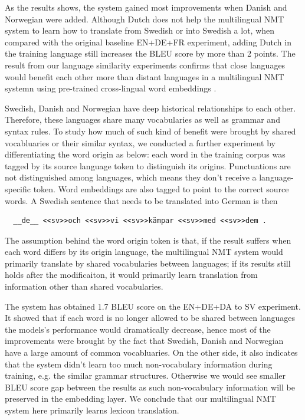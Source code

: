 \documentclass[thesis,fonts=libertine]{cluu}
\begin{document}
As the results shows, the system gained most improvements when Danish and Norwegian were added. Although Dutch does not help the multilingual NMT system to learn how to translate from Swedish or into Swedish a lot, when compared with the original baseline EN+DE+FR experiment, adding Dutch in the training language still increases the BLEU score by more than 2 points. The result from our language similarity experiments confirms that close languages would benefit each other more than distant languages in a multilingual NMT systemn using pre-trained cross-lingual word embeddings \parencite{Qi:2018aa}.

Swedish, Danish and Norwegian have deep historical relationships to each other. Therefore, these languages share many vocabularies as well as grammar and syntax rules. To study how much of such kind of benefit were brought by shared vocabluaries or their similar syntax, we conducted a further experiment by differentiating the word origin as below: each word in the training corpus was tagged by its source language token to distinguish its origins. Punctuations are not distinguished among languages, which means they don't receive a language-specific token. Word embeddings are also tagged to point to the correct source words. A Swedish sentence that needs to be translated into German is then

\begin{verbatim}
  __de__ <<sv>>och <<sv>>vi <<sv>>kämpar <<sv>>med <<sv>>dem .
\end{verbatim}

The assumption behind the word origin token is that, if the result suffers when each word differs by its origin language, the multilingual NMT system would primarily translate by shared vocabularies between languages; if its results still holds after the modificaiton, it would primarily learn translation from information other than shared vocabularies.

The system has obtained 1.7 BLEU score on the EN+DE+DA to SV experiment. It showed that if each word is no longer allowed to be shared between languages the models's performance would dramatically decrease, hence most of the improvements were brought by the fact that Swedish, Danish and Norwegian have a large amount of common vocabluaries. On the other side, it also indicates that the system didn't learn too much non-vocabulary information during training, e.g. the similar grammar structures. Otherwise we would see smaller BLEU score gap between the results as such non-vocabulary information will be preserved in the embedding layer. We conclude that our multilingual NMT system here primarily learns lexicon translation.
\end{document}
